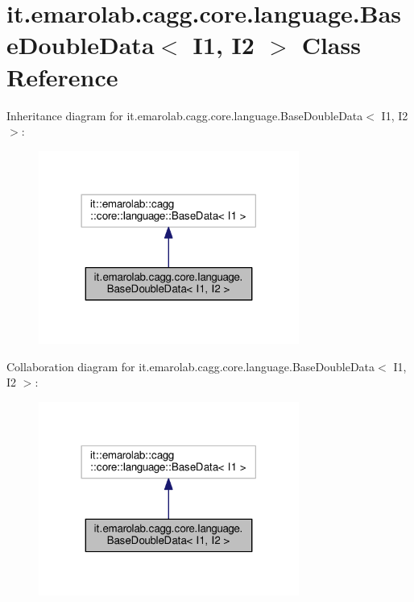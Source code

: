 \hypertarget{classit_1_1emarolab_1_1cagg_1_1core_1_1language_1_1BaseDoubleData_3_01I1_00_01I2_01_4}{\section{it.\-emarolab.\-cagg.\-core.\-language.\-Base\-Double\-Data$<$ I1, I2 $>$ Class Reference}
\label{classit_1_1emarolab_1_1cagg_1_1core_1_1language_1_1BaseDoubleData_3_01I1_00_01I2_01_4}
}


Inheritance diagram for it.\-emarolab.\-cagg.\-core.\-language.\-Base\-Double\-Data$<$ I1, I2 $>$\-:\nopagebreak
\begin{figure}[H]
\begin{center}
\leavevmode
\includegraphics[width=242pt]{classit_1_1emarolab_1_1cagg_1_1core_1_1language_1_1BaseDoubleData_3_01I1_00_01I2_01_4__inherit__graph}
\end{center}
\end{figure}


Collaboration diagram for it.\-emarolab.\-cagg.\-core.\-language.\-Base\-Double\-Data$<$ I1, I2 $>$\-:\nopagebreak
\begin{figure}[H]
\begin{center}
\leavevmode
\includegraphics[width=242pt]{classit_1_1emarolab_1_1cagg_1_1core_1_1language_1_1BaseDoubleData_3_01I1_00_01I2_01_4__coll__graph}
\end{center}
\end{figure}
